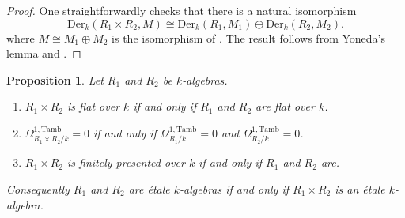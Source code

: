 \documentclass[11pt,dvipsnames]{amsart}
\newtheorem{proposition}[theorem]{Proposition}
\theoremstyle{BoldRemark}
\newcommand{\Tamb}{\mathrm{Tamb}}
\begin{document}
\begin{proof}
	One straightforwardly checks that there is a natural isomorphism 
    \[ 
        \mathrm{Der}_k(R_1 \times R_2, M) \cong \mathrm{Der}_k(R_1,M_1) \oplus \mathrm{Der}_k(R_2,M_2) .
    \] 
    where $M \cong M_1 \oplus M_2$ is the isomorphism of \cite[Proposition 5.3]{Wis25a}. The result follows from Yoneda's lemma and \cite[Theorem 5.7]{Hil17}.
\end{proof}

\begin{proposition}\label{prop:prod-of-etale-is-etale}
    Let $R_1$ and $R_2$ be $k$-algebras.
    \begin{enumerate}
        \item $R_1 \times R_2$ is flat over $k$ if and only if $R_1$ and $R_2$ are flat over $k$.
        \item $\Omega^{1,\Tamb}_{R_1 \times R_2/k} = 0$ if and only if $\Omega^{1,\Tamb}_{R_1/k} = 0$ and $\Omega^{1,\Tamb}_{R_2/k} = 0$.
        \item $R_1 \times R_2$ is finitely presented over $k$ if and only if $R_1$ and $R_2$ are.
    \end{enumerate}
    Consequently $R_1$ and $R_2$ are \'{e}tale $k$-algebras if and only if $R_1 \times R_2$ is an \'{e}tale $k$-algebra.
\end{proposition}
\end{document}
